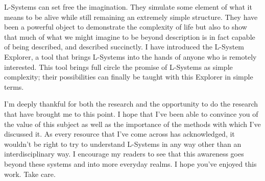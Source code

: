 \documentclass[12pt,twoside]{reedthesis}
\begin{document}
	L-Systems can set free the imagination. They simulate some element of what it means to be alive while still remaining an extremely simple structure. They have been a powerful object to demonstrate the complexity of life but also to show that much of what we might imagine to be beyond description is in fact capable of being described, and described succinctly. I have introduced the L-System Explorer, a tool that brings L-Systems into the hands of anyone who is remotely interested. This tool brings full circle the promise of L-Systems as simple complexity; their possibilities can finally be taught with this Explorer in simple terms.
	
	I'm deeply thankful for both the research and the opportunity to do the research that have brought me to this point. I hope that I've been able to convince you of the value of this subject as well as the importance of the methods with which I've discussed it. As every resource that I've come across has acknowledged, it wouldn't be right to try to understand L-Systems in any way other than an interdisciplinary way. I encourage my readers to see that this awareness goes beyond these systems and into more everyday realms. I hope you've enjoyed this work. Take care.
	

    \appendix
\end{document}

